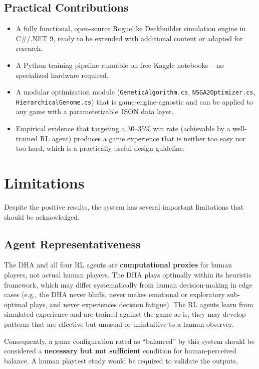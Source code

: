 \subsection{Practical Contributions}

\begin{itemize}
    \item A fully functional, open-source Roguelike Deckbuilder simulation engine in C\#/.NET 9, ready to be extended with additional content or adapted for research.
    \item A Python training pipeline runnable on free Kaggle notebooks -- no specialized hardware required.
    \item A modular optimization module (\texttt{GeneticAlgorithm.cs}, \texttt{NSGA2Optimizer.cs}, \texttt{HierarchicalGenome.cs}) that is game-engine-agnostic and can be applied to any game with a parameterizable JSON data layer.
    \item Empirical evidence that targeting a 30--35\% win rate (achievable by a well-trained RL agent) produces a game experience that is neither too easy nor too hard, which is a practically useful design guideline.
\end{itemize}

\section{Limitations}

Despite the positive results, the system has several important limitations that should be acknowledged.

\subsection{Agent Representativeness}

The DHA and all four RL agents are \textbf{computational proxies} for human players, not actual human players. The DHA plays optimally within its heuristic framework, which may differ systematically from human decision-making in edge cases (e.g., the DHA never bluffs, never makes emotional or exploratory sub-optimal plays, and never experiences decision fatigue). The RL agents learn from simulated experience and are trained against the game as-is; they may develop patterns that are effective but unusual or unintuitive to a human observer.

Consequently, a game configuration rated as ``balanced'' by this system should be considered a \textbf{necessary but not sufficient} condition for human-perceived balance. A human playtest study would be required to validate the outputs.

